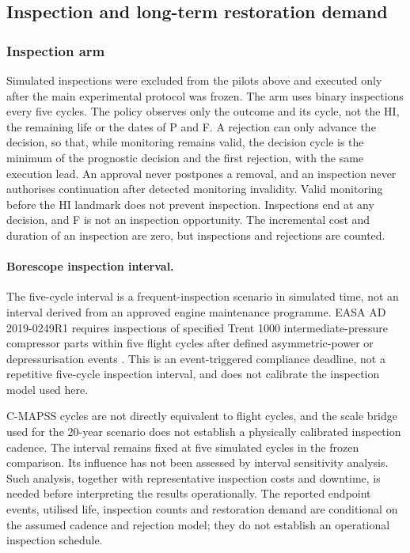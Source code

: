 \documentclass[preprint,12pt]{elsarticle}
\begin{document}
\subsection{Inspection and long-term restoration demand}


\subsubsection{Inspection arm}\label{sec:inspection-method}

Simulated inspections were excluded from the pilots above and executed only after the main experimental protocol was frozen. The arm uses binary inspections every five cycles. The policy observes only the outcome and its cycle, not the HI, the remaining life or the dates of P and F. A rejection can only advance the decision, so that, while monitoring remains valid, the decision cycle is the minimum of the prognostic decision and the first rejection, with the same execution lead. An approval never postpones a removal, and an inspection never authorises continuation after detected monitoring invalidity. Valid monitoring before the HI landmark does not prevent inspection. Inspections end at any decision, and F is not an inspection opportunity. The incremental cost and duration of an inspection are zero, but inspections and rejections are counted.

\paragraph{Borescope inspection interval.}
The five-cycle interval is a frequent-inspection scenario in simulated time, not an interval derived from an approved engine maintenance programme. EASA AD 2019-0249R1 requires inspections of specified Trent 1000 intermediate-pressure compressor parts within five flight cycles after defined asymmetric-power or depressurisation events \cite{EASA2019_0249R1}. This is an event-triggered compliance deadline, not a repetitive five-cycle inspection interval, and does not calibrate the inspection model used here.

C-MAPSS cycles are not directly equivalent to flight cycles, and the scale bridge used for the 20-year scenario does not establish a physically calibrated inspection cadence. The interval remains fixed at five simulated cycles in the frozen comparison. Its influence has not been assessed by interval sensitivity analysis. Such analysis, together with representative inspection costs and downtime, is needed before interpreting the results operationally. The reported endpoint events, utilised life, inspection counts and restoration demand are conditional on the assumed cadence and rejection model; they do not establish an operational inspection schedule.
\end{document}
